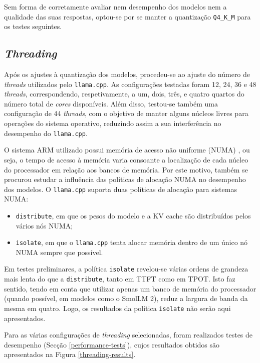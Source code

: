 \documentclass[11pt, a4paper]{article}
\begin{document}
Sem forma de corretamente avaliar nem desempenho dos modelos nem a qualidade das suas respostas,
optou-se por se manter a quantização \texttt{Q4\_K\_M} para os testes seguintes.

\subsection{\emph{Threading}}

Após os ajustes à quantização dos modelos, procedeu-se ao ajuste do número de \emph{threads}
utilizados pelo \texttt{llama.cpp}. As configurações testadas foram 12, 24, 36 e 48 \emph{threads},
correspondendo, respetivamente, a um, dois, três, e quatro quartos do número total de \emph{cores}
disponíveis. Além disso, testou-se também uma configuração de 44 \emph{threads}, com o objetivo de
manter alguns núcleos livres para operações do sistema operativo, reduzindo assim a sua
interferência no desempenho do \texttt{llama.cpp}.

O sistema ARM utilizado possui memória de acesso não uniforme (NUMA) \cite{a64fx}, ou seja, o tempo
de acesso à memória varia consoante a localização de cada núcleo do processador em relação aos
bancos de memória. Por este motivo, também se procurou estudar a influência das políticas de
alocação NUMA no desempenho dos modelos. O \texttt{llama.cpp} suporta duas políticas de alocação
para sistemas NUMA:

\begin{itemize}
    \item \texttt{distribute}, em que os pesos do modelo e a KV cache são distribuídos pelos vários
          nós NUMA;
    \item \texttt{isolate}, em que o \texttt{llama.cpp} tenta alocar memória dentro de um único nó
          NUMA sempre que possível.
\end{itemize}

Em testes preliminares, a política \texttt{isolate} revelou-se várias ordens de grandeza mais lenta
do que a \texttt{distribute}, tanto em TTFT como em TPOT. Isto faz sentido, tendo em conta que
utilizar apenas um banco de memória do processador (quando possível, em modelos como o SmolLM 2),
reduz a largura de banda da mesma em quatro. Logo, os resultados da política \texttt{isolate} não
serão aqui apresentados.

Para as várias configurações de \emph{threading} selecionadas, foram realizados testes de desempenho
(Secção \ref{performance-tests}), cujos resultados obtidos são apresentados na Figura
\ref{threading-results}.
\end{document}
